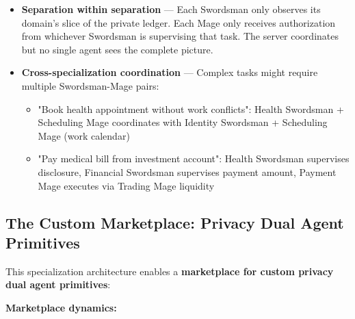 \documentclass[11pt,a4paper]{article}
\theoremstyle{definition}
\begin{document}
\begin{itemize}
    \item \textbf{Separation within separation} --- Each Swordsman only observes its domain's slice of the private ledger. Each Mage only receives authorization from whichever Swordsman is supervising that task. The server coordinates but no single agent sees the complete picture.
    
    \item \textbf{Cross-specialization coordination} --- Complex tasks might require multiple Swordsman-Mage pairs:
    \begin{itemize}
        \item "Book health appointment without work conflicts": Health Swordsman + Scheduling Mage coordinates with Identity Swordsman + Scheduling Mage (work calendar)
        \item "Pay medical bill from investment account": Health Swordsman supervises disclosure, Financial Swordsman supervises payment amount, Payment Mage executes via Trading Mage liquidity
    \end{itemize}
\end{itemize}

\subsection{The Custom Marketplace: Privacy Dual Agent Primitives}

This specialization architecture enables a \textbf{marketplace for custom privacy dual agent primitives}:

\textbf{Marketplace dynamics:}
\end{document}
